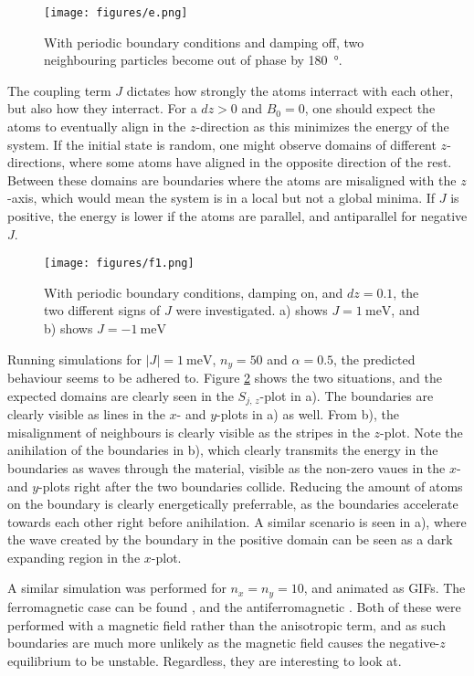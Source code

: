 \begin{figure}
    \centering
    \texttt{[image: figures/e.png]}
    \caption{
        With periodic boundary conditions and damping off, 
        two neighbouring particles become out of phase by \SI{180}{\degree}.
    }
    \label{fig:e2}
\end{figure}

The coupling term $J$ dictates how strongly the atoms interract with each other, but also how they interract.
For a $dz > 0$ and $B_0 = 0$, one should expect the atoms to eventually align in the $z$-direction as this
minimizes the energy of the system. If the initial state is random, one might observe domains of different $z$-directions,
where some atoms have aligned in the opposite direction of the rest. Between these domains are boundaries
where the atoms are misaligned with the $z$-axis, which would mean the system is in a local but not a global minima. 
If $J$ is positive, the energy is lower if the atoms are parallel, and antiparallel for negative $J$. 

\begin{figure}
    \centering
    \texttt{[image: figures/f1.png]}
    \caption{
        With periodic boundary conditions, damping on, and $dz = 0.1$,
        the two different signs of $J$ were investigated. 
        a) shows $J = \SI{1}{\milli\electronvolt}$, and
        b) shows $J = \SI{-1}{\milli\electronvolt}$
    }
    \label{fig:f}
\end{figure}

Running simulations for $|J| = \SI{1}{\milli\electronvolt}$, $n_y = 50$ and $\alpha = 0.5$, 
the predicted behaviour seems to be adhered to. Figure \ref{fig:f} shows the two situations,
and the expected domains are clearly seen in the $S_{j,\,z}$-plot in a). 
The boundaries are clearly visible as lines in the $x$- and $y$-plots in a) as well.
From b), the misalignment of neighbours is clearly visible as the stripes in the $z$-plot.
Note the anihilation of the boundaries in b), which clearly transmits the energy in the 
boundaries as waves through the material, visible as the non-zero vaues in the $x$- and $y$-plots
right after the two boundaries collide. Reducing the amount of atoms on the boundary is clearly
energetically preferrable, as the boundaries accelerate towards each other right before anihilation.
A similar scenario is seen in a), where the wave created by the boundary in the positive domain
can be seen as a dark expanding region in the $x$-plot. 

A similar simulation was performed for $n_x = n_y = 10$, and animated as GIFs. 
The ferromagnetic case can be found 
\href{https://random.timini.no/viljarjf/ferromagnet.gif}{\color{blue}{here}}, 
and the antiferromagnetic 
\href{https://random.timini.no/viljarjf/antiferromagnet.gif}{\color{blue}{here}}.
Both of these were performed with a magnetic field rather than the anisotropic term, 
and as such boundaries are much more unlikely as the magnetic field causes the 
negative-$z$ equilibrium to be unstable. Regardless, they are interesting to look at.
